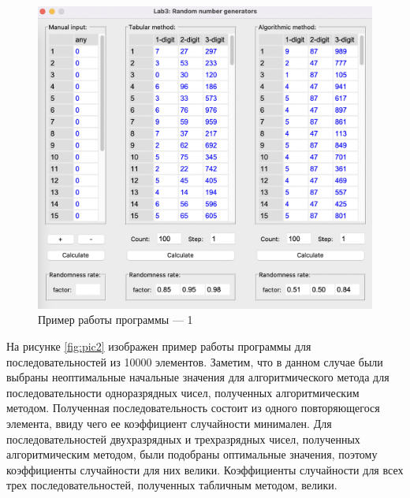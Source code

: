 \documentclass[12pt]{report}
\begin{document}
\begin{figure}[h!btp]
	\centering
	\includegraphics[width=1\textwidth]{inc/pic1.png}
	\caption{Пример работы программы --- 1}
	\label{fig:pic1}	
\end{figure}

\clearpage
На рисунке \ref{fig:pic2} изображен пример работы программы для последовательностей из 10000 элементов.
Заметим, что в данном случае были выбраны неоптимальные начальные значения для алгоритмического метода для последовательности одноразрядных чисел, полученных алгоритмическим методом. Полученная последовательность состоит из одного повторяющегося элемента, ввиду чего ее коэффициент случайности минимален. Для последовательностей двухразрядных и трехразрядных чисел, полученных алгоритмическим методом, были подобраны оптимальные значения, поэтому коэффициенты случайности для них велики. 
Коэффициенты случайности для всех трех последовательностей, полученных табличным методом, велики.
\end{document}
